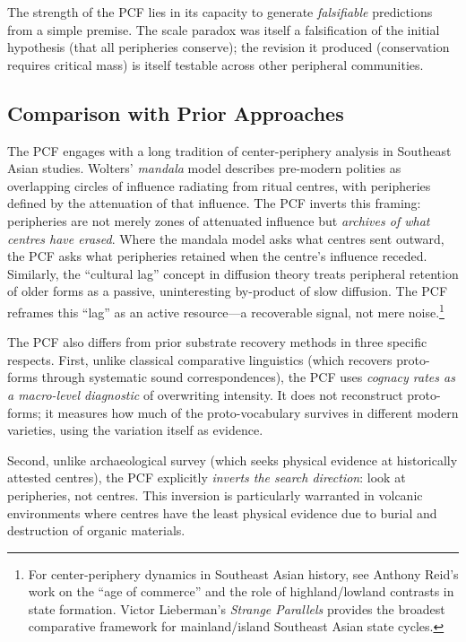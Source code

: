 \documentclass[12pt,a4paper]{article}
\begin{document}
The strength of the PCF lies in its capacity to generate \emph{falsifiable} predictions from a simple premise. The scale paradox was itself a falsification of the initial hypothesis (that all peripheries conserve); the revision it produced (conservation requires critical mass) is itself testable across other peripheral communities.

\subsection{Comparison with Prior Approaches}

The PCF engages with a long tradition of center-periphery analysis in Southeast Asian studies. Wolters' \emph{mandala} model describes pre-modern polities as overlapping circles of influence radiating from ritual centres, with peripheries defined by the attenuation of that influence. The PCF inverts this framing: peripheries are not merely zones of attenuated influence but \emph{archives of what centres have erased}. Where the mandala model asks what centres sent outward, the PCF asks what peripheries retained when the centre's influence receded. Similarly, the ``cultural lag'' concept in diffusion theory treats peripheral retention of older forms as a passive, uninteresting by-product of slow diffusion. The PCF reframes this ``lag'' as an active resource---a recoverable signal, not mere noise.\footnote{For center-periphery dynamics in Southeast Asian history, see Anthony Reid's work on the ``age of commerce'' and the role of highland/lowland contrasts in state formation. Victor Lieberman's \emph{Strange Parallels} provides the broadest comparative framework for mainland/island Southeast Asian state cycles.}

The PCF also differs from prior substrate recovery methods in three specific respects. First, unlike classical comparative linguistics (which recovers proto-forms through systematic sound correspondences), the PCF uses \emph{cognacy rates as a macro-level diagnostic} of overwriting intensity. It does not reconstruct proto-forms; it measures how much of the proto-vocabulary survives in different modern varieties, using the variation itself as evidence.

Second, unlike archaeological survey (which seeks physical evidence at historically attested centres), the PCF explicitly \emph{inverts the search direction}: look at peripheries, not centres. This inversion is particularly warranted in volcanic environments where centres have the least physical evidence due to burial and destruction of organic materials.
\end{document}
